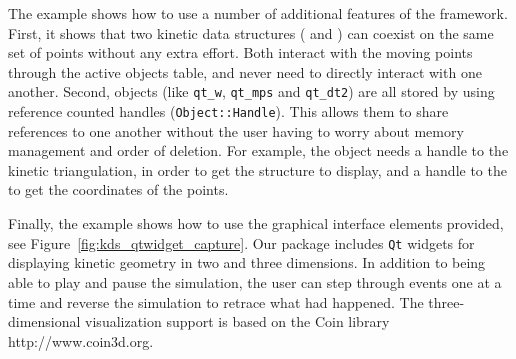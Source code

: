 The example shows how to use a number of additional features of the
framework. First, it shows that two kinetic data structures
( and
) can coexist on the same set of
points without any extra effort. Both interact with the moving points
through the active objects table, and never need to directly interact
with one another. Second, objects (like
\texttt{qt\_w}, \texttt{qt\_mps} and \texttt{qt\_dt2}) are all stored
by using reference counted handles (\texttt{Object::Handle}). This
allows them to share references to one another without the user having
to worry about memory management and order of deletion.  For example,
the  object needs a handle to the kinetic
triangulation, in order to get the structure to display, and a handle
to the  to get the coordinates of the
points.


Finally, the example shows how to use the graphical interface elements
provided, see Figure~\ref{fig:kds_qtwidget_capture}. Our package includes
\texttt{Qt} widgets for displaying kinetic geometry in two and three
dimensions. In addition to being able to play and pause the
simulation, the user can step through events one at a time and reverse
the simulation to retrace what had happened. The three-dimensional
visualization support is based on the Coin library http://www.coin3d.org.

